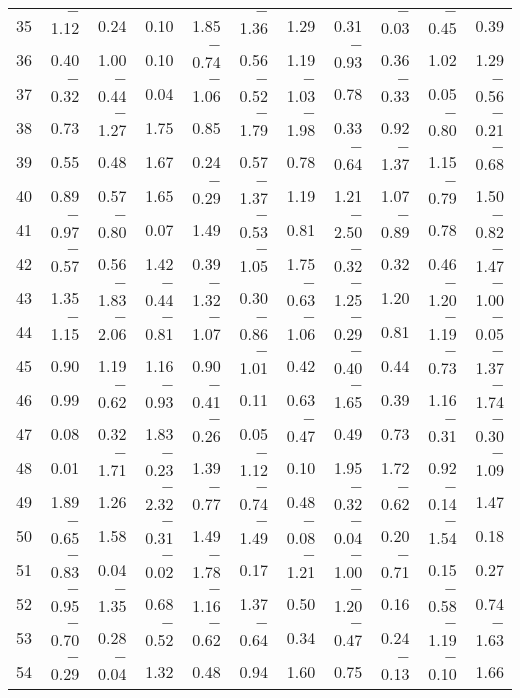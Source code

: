 \documentclass[letterpaper]{article}
\begin{document}
\begin{Schunk}
\begin{longtable}{rrrrrrrrrrr}
  35 & $-$1.12 & 0.24 & 0.10 & 1.85 & $-$1.36 & 1.29 & 0.31 & $-$0.03 & $-$0.45 & 0.39 \\
  36 & 0.40 & 1.00 & 0.10 & $-$0.74 & 0.56 & 1.19 & $-$0.93 & 0.36 & 1.02 & 1.29 \\
  37 & $-$0.32 & $-$0.44 & 0.04 & $-$1.06 & $-$0.52 & $-$1.03 & 0.78 & $-$0.33 & 0.05 & $-$0.56 \\
  38 & 0.73 & $-$1.27 & 1.75 & 0.85 & $-$1.79 & $-$1.98 & 0.33 & 0.92 & $-$0.80 & $-$0.21 \\
  39 & 0.55 & 0.48 & 1.67 & 0.24 & 0.57 & 0.78 & $-$0.64 & $-$1.37 & 1.15 & $-$0.68 \\
  40 & 0.89 & 0.57 & 1.65 & $-$0.29 & $-$1.37 & 1.19 & 1.21 & 1.07 & $-$0.79 & 1.50 \\
  41 & $-$0.97 & $-$0.80 & 0.07 & 1.49 & $-$0.53 & 0.81 & $-$2.50 & $-$0.89 & 0.78 & $-$0.82 \\
  42 & $-$0.57 & 0.56 & 1.42 & 0.39 & $-$1.05 & 1.75 & $-$0.32 & 0.32 & 0.46 & $-$1.47 \\
  43 & 1.35 & $-$1.83 & $-$0.44 & $-$1.32 & 0.30 & $-$0.63 & $-$1.25 & 1.20 & $-$1.20 & $-$1.00 \\
  44 & $-$1.15 & $-$2.06 & $-$0.81 & $-$1.07 & $-$0.86 & $-$1.06 & $-$0.29 & 0.81 & $-$1.19 & $-$0.05 \\
  45 & 0.90 & 1.19 & 1.16 & 0.90 & $-$1.01 & 0.42 & $-$0.40 & 0.44 & $-$0.73 & $-$1.37 \\
  46 & 0.99 & $-$0.62 & $-$0.93 & $-$0.41 & 0.11 & 0.63 & $-$1.65 & 0.39 & 1.16 & $-$1.74 \\
  47 & 0.08 & 0.32 & 1.83 & $-$0.26 & 0.05 & $-$0.47 & 0.49 & 0.73 & $-$0.31 & $-$0.30 \\
  48 & 0.01 & $-$1.71 & $-$0.23 & 1.39 & $-$1.12 & 0.10 & 1.95 & 1.72 & 0.92 & $-$1.09 \\
  49 & 1.89 & 1.26 & $-$2.32 & $-$0.77 & $-$0.74 & 0.48 & $-$0.32 & $-$0.62 & $-$0.14 & 1.47 \\
  50 & $-$0.65 & 1.58 & $-$0.31 & 1.49 & $-$1.49 & $-$0.08 & $-$0.04 & 0.20 & $-$1.54 & 0.18 \\
  51 & $-$0.83 & 0.04 & $-$0.02 & $-$1.78 & 0.17 & $-$1.21 & $-$1.00 & $-$0.71 & 0.15 & 0.27 \\
  52 & $-$0.95 & $-$1.35 & 0.68 & $-$1.16 & 1.37 & 0.50 & $-$1.20 & 0.16 & $-$0.58 & 0.74 \\
  53 & $-$0.70 & 0.28 & $-$0.52 & $-$0.62 & $-$0.64 & 0.34 & $-$0.47 & 0.24 & $-$1.19 & $-$1.63 \\
  54 & $-$0.29 & $-$0.04 & 1.32 & 0.48 & 0.94 & 1.60 & 0.75 & $-$0.13 & $-$0.10 & 1.66 \\

\end{longtable}
\end{Schunk}
\end{document}
